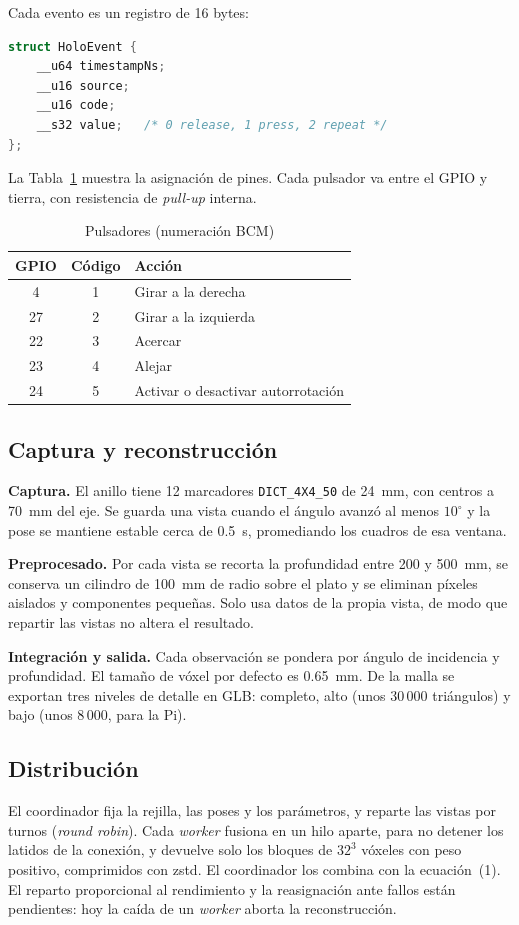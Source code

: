 \documentclass[journal]{IEEEtran}
\begin{document}
Cada evento es un registro de 16 bytes:
\begin{lstlisting}[language=C]
struct HoloEvent {
    __u64 timestampNs;
    __u16 source;
    __u16 code;
    __s32 value;   /* 0 release, 1 press, 2 repeat */
};
\end{lstlisting}

La Tabla~\ref{tab:botones} muestra la asignación de pines. Cada pulsador va entre
el GPIO y tierra, con resistencia de \emph{pull-up} interna.

\begin{table}[!t]
\caption{Pulsadores (numeración BCM)}
\label{tab:botones}
\centering
\footnotesize
\begin{tabular}{ccl}
\toprule
\textbf{GPIO} & \textbf{Código} & \textbf{Acción}\\
\midrule
4 & 1 & Girar a la derecha\\
27 & 2 & Girar a la izquierda\\
22 & 3 & Acercar\\
23 & 4 & Alejar\\
24 & 5 & Activar o desactivar autorrotación\\
\bottomrule
\end{tabular}
\end{table}

\subsection{Captura y reconstrucción}
\textbf{Captura.} El anillo tiene 12 marcadores \texttt{DICT\_4X4\_50} de 24~mm,
con centros a 70~mm del eje. Se guarda una vista cuando el ángulo avanzó al menos
$10^{\circ}$ y la pose se mantiene estable cerca de 0.5~s, promediando los
cuadros de esa ventana.

\textbf{Preprocesado.} Por cada vista se recorta la profundidad entre 200 y
500~mm, se conserva un cilindro de 100~mm de radio sobre el plato y se eliminan
píxeles aislados y componentes pequeñas. Solo usa datos de la propia vista, de
modo que repartir las vistas no altera el resultado.

\textbf{Integración y salida.} Cada observación se pondera por ángulo de
incidencia y profundidad. El tamaño de vóxel por defecto es 0.65~mm. De la malla
se exportan tres niveles de detalle en GLB: completo, alto (unos 30\,000
triángulos) y bajo (unos 8\,000, para la Pi).

\subsection{Distribución}
El coordinador fija la rejilla, las poses y los parámetros, y reparte las vistas
por turnos (\emph{round robin}). Cada \emph{worker} fusiona en un hilo aparte,
para no detener los latidos de la conexión, y devuelve solo los bloques de $32^3$
vóxeles con peso positivo, comprimidos con zstd. El coordinador los combina con
la ecuación~(1). El reparto proporcional al rendimiento y la reasignación ante
fallos están pendientes: hoy la caída de un \emph{worker} aborta la
reconstrucción.
\end{document}
